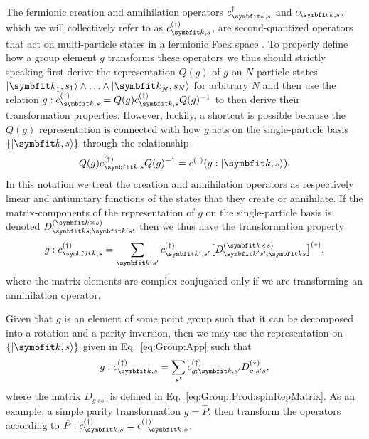 The fermionic creation and annihilation operators $c^\dagger_{\v{k},s}$ and $c_{\v{k},s}$, which we will collectively refer to as
$c^{(\dagger)}_{\v{k},s}$, are second-quantized operators that act on multi-particle
states in a fermionic Fock space \cite{NegeleOrland98}. To properly define how a group element $g$ transforms these operators we thus should
strictly speaking first derive the representation $Q(g)$ of $g$ on $N$-particle states $\ket{\v{k}_1,s_1}\land\ldots\land\ket{\v{k}_N,s_N}$ for
arbitrary $N$ and then use the relation $g:c^{(\dagger)}_{\v{k},s} = Q(g)c^{(\dagger)}_{\v{k},s}Q(g)^{-1}$ to then derive their transformation properties.
However, luckily, a shortcut is possible because the $Q(g)$ representation is connected with how $g$ acts on the single-particle basis
$\{\ket{\v{k},s}\}$ through the relationship
\begin{equation}
    \label{eq:Group:App:Ladder:quantizedRepToSingleParticleBasis}
    Q(g)c^{(\dagger)}_{\v{k},s}Q(g)^{-1} = c^{(\dagger)}(g:\ket{\v{k},s}).
\end{equation}
In this notation we treat the creation and annihilation operators as respectively linear and antiunitary functions of the states that they create or
annihilate. If the matrix-components of the representation of $g$ on the single-particle basis is denoted $D_{\v{k}s;\v{k}'s'}^{(\v{k}\times s)}$ then
we thus have the transformation property
\begin{equation}
    \label{eq:Group:App:Ladder:generalTransformationBehavior}
    g:c^{(\dagger)}_{\v{k},s} = \sum_{\v{k}'s'}c^{(\dagger)}_{\v{k}',s'}\big[D_{\v{k}'s';\v{k}s}^{(\v{k}\times s)}\big]^{(\ast)},
\end{equation}
where the matrix-elements are complex conjugated only if we are transforming an annihilation operator.

Given that $g$ is an element of some point group such that it can be decomposed into a rotation and a parity inversion, then we may use the
representation on $\{\ket{\v{k},s}\}$ given in Eq.~\eqref{eq:Group:App} such that
\begin{equation}
    \label{eq:Group:App:Ladder:pointGroupTransformation}
    g:c^{(\dagger)}_{\v{k},s} = \sum_{s'}c^{(\dagger)}_{g:\v{k},s'}D_{g\;s's}^{(\ast)},
\end{equation}
where the matrix $D_{g\;ss'}$ is defined in Eq.~\eqref{eq:Group:Prod:spinRepMatrix}. As an example, a simple parity transformation $g=\hat{P}$, then
transform the operators according to $\hat{P}:c^{(\dagger)}_{\v{k},s} = c^{(\dagger)}_{-\v{k},s}$.


